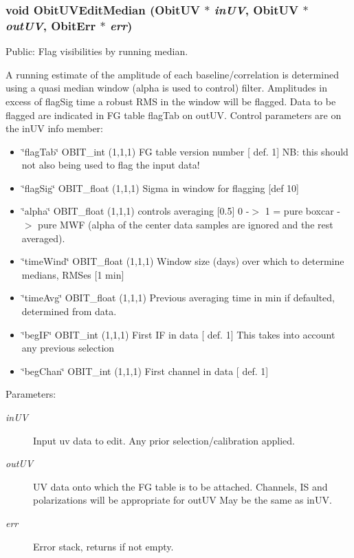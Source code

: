 \subsubsection{\setlength{\rightskip}{0pt plus 5cm}void Obit\-UVEdit\-Median ({\bf Obit\-UV} $\ast$ {\em in\-UV}, {\bf Obit\-UV} $\ast$ {\em out\-UV}, {\bf Obit\-Err} $\ast$ {\em err})}\label{ObitUVEdit_8h_a6}


Public: Flag visibilities by running median. 

A running estimate of the amplitude of each baseline/correlation is determined using a quasi median window (alpha is used to control) filter. Amplitudes in excess of flag\-Sig time a robust RMS in the window will be flagged. Data to be flagged are indicated in FG table flag\-Tab on out\-UV. Control parameters are on the in\-UV info member: \begin{itemize}
\item \char`\"{}flag\-Tab\char`\"{} OBIT\_\-int (1,1,1) FG table version number [ def. 1] NB: this should not also being used to flag the input data! \item \char`\"{}flag\-Sig\char`\"{} OBIT\_\-float (1,1,1) Sigma in window for flagging [def 10] \item \char`\"{}alpha\char`\"{} OBIT\_\-float (1,1,1) controls averaging [0.5] 0 -$>$ 1 = pure boxcar -$>$ pure MWF (alpha of the center data samples are ignored and the rest averaged). \item \char`\"{}time\-Wind\char`\"{} OBIT\_\-float (1,1,1) Window size (days) over which to determine medians, RMSes [1 min] \item \char`\"{}time\-Avg\char`\"{} OBIT\_\-float (1,1,1) Previous averaging time in min if defaulted, determined from data. \item \char`\"{}beg\-IF\char`\"{} OBIT\_\-int (1,1,1) First IF in data [ def. 1] This takes into account any previous selection \item \char`\"{}beg\-Chan\char`\"{} OBIT\_\-int (1,1,1) First channel in data [ def. 1]\end{itemize}
\begin{Desc}
\item[Parameters:]
\begin{description}
\item[{\em in\-UV}]Input uv data to edit. Any prior selection/calibration applied. \item[{\em out\-UV}]UV data onto which the FG table is to be attached. Channels, IS and polarizations will be appropriate for out\-UV May be the same as in\-UV. \item[{\em err}]Error stack, returns if not empty. \end{description}
\end{Desc}
